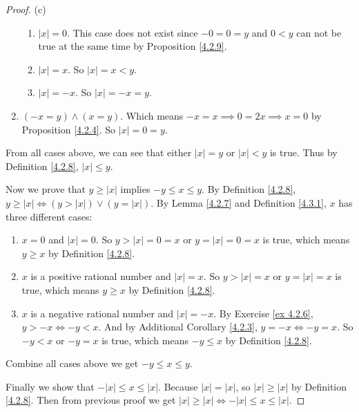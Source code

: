 \begin{proof}{(c)}
\begin{enumerate}[label=(\Roman*)]
    \begin{enumerate}[label=(\roman*)]
        \item \(|x| = 0\).
        This case does not exist since \(-0 = 0 = y\) and \(0 < y\) can not be true at the same time by Proposition \ref{4.2.9}.
        \item \(|x| = x\).
        So \(|x| = x < y\).
        \item \(|x| = -x\).
        So \(|x| = -x = y\).
    \end{enumerate}
    \item \((-x = y) \land (x = y)\).
    Which means \(-x = x \implies 0 = 2x \implies x = 0\) by Proposition \ref{4.2.4}.
    So \(|x| = 0 = y\).
\end{enumerate}
From all cases above, we can see that either \(|x| = y\) or \(|x| < y\) is true.
Thus by Definition \ref{4.2.8}, \(|x| \leq y\).

Now we prove that \(y \geq |x|\) implies \(-y \leq x \leq y\).
By Definition \ref{4.2.8}, \(y \geq |x| \iff (y > |x|) \lor (y = |x|)\).
By Lemma \ref{4.2.7} and Definition \ref{4.3.1}, \(x\) has three different cases:
\begin{enumerate}[label=(\roman*)]
    \item \(x = 0\) and \(|x| = 0\).
    So \(y > |x| = 0 = x\) or \(y = |x| = 0 = x\) is true, which means \(y \geq x\) by Definition \ref{4.2.8}.
    \item \(x\) is a positive rational number and \(|x| = x\).
    So \(y > |x| = x\) or \(y = |x| = x\) is true, which means \(y \geq x\) by Definition \ref{4.2.8}.
    \item \(x\) is a negative rational number and \(|x| = -x\).
    By Exercise \ref{ex 4.2.6}, \(y > -x \iff -y < x\).
    And by Additional Corollary \ref{4.2.3}, \(y = -x \iff -y = x\).
    So \(-y < x\) or \(-y = x\) is true, which means \(-y \leq x\) by Definition \ref{4.2.8}.
\end{enumerate}
Combine all cases above we get \(-y \leq x \leq y\).

Finally we show that \(-|x| \leq x \leq |x|\).
Because \(|x| = |x|\), so \(|x| \geq |x|\) by Definition \ref{4.2.8}.
Then from previous proof we get \(|x| \geq |x| \iff -|x| \leq x \leq |x|\).
\end{proof}


